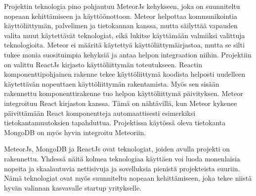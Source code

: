 \documentclass[11pt,a4paper,titlepage,oneside]{article}
\begin{document}
Projektin teknologia pino pohjautuu MeteorJs kehykseen, joka on suunniteltu nopeaan kehittämiseen ja käyttöönottoon.
Meteor helpottaa kommunikointia käyttöliittymän, palvelimen ja tietokannan kanssa, 
mutta säilyttää vapauden valita muut käytettävät teknologiat, eikä lukitse käyttämään valmiiksi valittuja teknologioita.
Meteor ei määritä käytettyä käyttöliittymäirjastoa, mutta se silti tukee monia suosituimpia kehyksiä ja antaa helpon integraation niihin.
Projektiin on valittu ReactJs kirjasto käyttöliittymän toteutukseen.
Reactin komponenttipohjainen rakenne tekee käyttöliittymä koodista helposti uudelleen käytettävän nopeuttaen käyttöliittymän rakentamista. 
Myös sen sisään rakennettu komponenttirakenne tuo helpon käyttöliittymä päivityksen.
Meteor integroituu React kirjaston kanssa.
Tämä on nähtävillä, kun Meteor kykenee päivittämään React komponentteja automaattisesti esimerkiksi tietokantamuutoksien tapahduttua. 
Projektissa käytössä oleva tietokanta MongoDB on myös hyvin integroitu Meteoriin.
\medskip


MeteorJs, MongoDB ja ReactJs ovat teknologiat, joiden avulla projekti on rakennettu.
Yhdessä näitä kolmea teknologiaa käyttäen voi luoda monenlaisia nopeita ja skaalautuvia nettisivuja ja sovelluksia pienistä projekteista suuriin.
Nämä teknologiat ovat myös suunniteltu nopeaan kehittämiseen, joka tekee niistä hyvän valinnan kasvavalle startup yritykselle.
\medskip









\newpage
{}                %




\newpage
{}%






\newpage
{}        %
\end{document}

